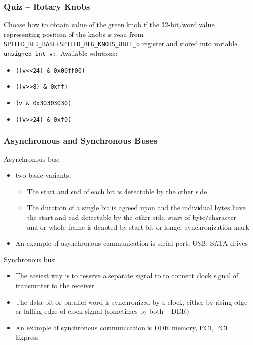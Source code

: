 \documentclass{beamer}
\begin{document}
\begin{frame}
\frametitle{Quiz -- Rotary Knobs}

Choose how to obtain value of the green knob if the 32-bit/word value representing position of the knobs is read from \texttt{SPILED\_REG\_BASE+SPILED\_REG\_KNOBS\_8BIT\_o} register  and stored into variable \texttt{unsigned int v;}. Available solutions:
\begin{itemize}
\item[A] \texttt{((v<<24) \& 0x00ff00)}
\item[B] \texttt{((v>>8) \& 0xff)}
\item[C] \texttt{(v \& 0x30303030)}
\item[D] \texttt{((v>>24) \& 0xf0)}
\end{itemize}
\end{frame}



\begin{frame}
\frametitle{Asynchronous and Synchronous Buses}

Asynchronous bus:
\begin{itemize}
\item two basic variants:
\begin{itemize}
\item The start and end of each bit is detectable by the other side
\item The duration of a single bit is agreed upon and the individual bytes have the start and end detectable by the other side, start of byte/character and or whole frame is denoted by start bit or longer synchronization mark
\end{itemize}
\item An example of asynchronous communication is serial port, USB, SATA drives
\end{itemize}


Synchronous bus:
\begin{itemize}
\item The easiest way is to reserve a separate signal to to connect clock signal of transmitter to the receiver
\item The data bit or parallel word is synchronized by a clock, either by rising edge or falling edge of clock signal (sometimes by both -- DDR)
\item An example of synchronous communication is DDR memory, PCI, PCI Express
\end{itemize}
\end{frame}
\end{document}

